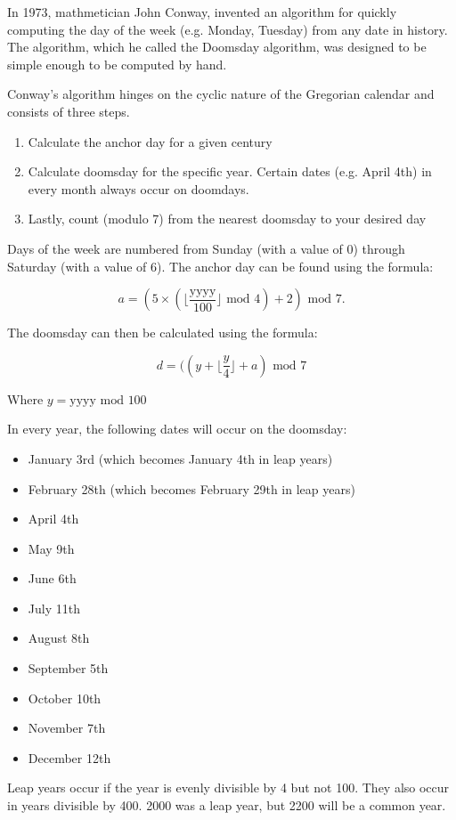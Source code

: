 In 1973, mathmetician John Conway, invented an algorithm for quickly computing
the day of the week (e.g. Monday, Tuesday) from any date in history. The algorithm,
which he called the Doomsday algorithm, was designed to be simple enough to be
computed by hand.

Conway's algorithm hinges on the cyclic nature of the Gregorian calendar and consists
of three steps.
\begin{enumerate}
    \item Calculate the anchor day for a given century
    \item Calculate doomsday for the specific year. Certain dates (e.g. April 4th)
        in every month always occur on doomdays.
    \item Lastly, count (modulo 7) from the nearest doomsday to your desired day
\end{enumerate}

Days of the week are numbered from Sunday (with a value of $0$) through Saturday 
(with a value of $6$). The anchor day can be found using the formula:

\[a = (5\times(\lfloor{\dfrac{\text{yyyy}}{100}}\rfloor \text{ mod } 4) + 2) \text{ mod }7.\]

The doomsday can then be calculated using the formula:

\[d = ((y + \lfloor{\dfrac{y}{4}}\rfloor +  a) \text{ mod } 7\]

Where $y = \text{yyyy  mod } 100$

In every year, the following dates will occur on the doomsday:
\begin{itemize}
    \item January 3rd (which becomes January 4th in leap years)
    \item February 28th (which becomes February 29th in leap years)
    \item April 4th
    \item May 9th
    \item June 6th
    \item July 11th
    \item August 8th
    \item September 5th
    \item October 10th
    \item November 7th
    \item December 12th
\end{itemize}

Leap years occur if the year is evenly divisible by 4 but not 100. They
also occur in years divisible by 400. 2000 was a leap year, but 2200 will
be a common year.
